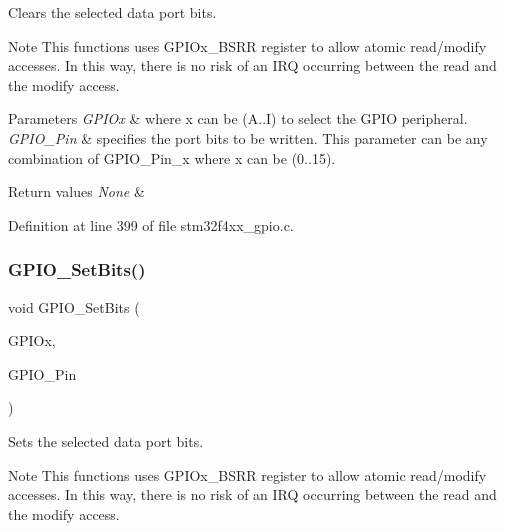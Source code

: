 Clears the selected data port bits. 

\begin{DoxyNote}{Note}
This functions uses G\+P\+I\+Ox\+\_\+\+B\+S\+RR register to allow atomic read/modify accesses. In this way, there is no risk of an I\+RQ occurring between the read and the modify access. 
\end{DoxyNote}

\begin{DoxyParams}{Parameters}
{\em G\+P\+I\+Ox} & where x can be (A..I) to select the G\+P\+IO peripheral. \\
\hline
{\em G\+P\+I\+O\+\_\+\+Pin} & specifies the port bits to be written. This parameter can be any combination of G\+P\+I\+O\+\_\+\+Pin\+\_\+x where x can be (0..15). \\
\hline
\end{DoxyParams}

\begin{DoxyRetVals}{Return values}
{\em None} & \\
\hline
\end{DoxyRetVals}


Definition at line 399 of file stm32f4xx\+\_\+gpio.\+c.

\mbox{\label{group___g_p_i_o_ga9e1352eed7c6620e18af2d86f6b6ff8e}} 
\subsubsection{\texorpdfstring{G\+P\+I\+O\+\_\+\+Set\+Bits()}{GPIO\_SetBits()}}
{\footnotesize\ttfamily void G\+P\+I\+O\+\_\+\+Set\+Bits (\begin{DoxyParamCaption}\item[{\hyperlink{struct_g_p_i_o___type_def}{G\+P\+I\+O\+\_\+\+Type\+Def} $\ast$}]{G\+P\+I\+Ox,  }\item[{uint16\+\_\+t}]{G\+P\+I\+O\+\_\+\+Pin }\end{DoxyParamCaption})}



Sets the selected data port bits. 

\begin{DoxyNote}{Note}
This functions uses G\+P\+I\+Ox\+\_\+\+B\+S\+RR register to allow atomic read/modify accesses. In this way, there is no risk of an I\+RQ occurring between the read and the modify access. 
\end{DoxyNote}

